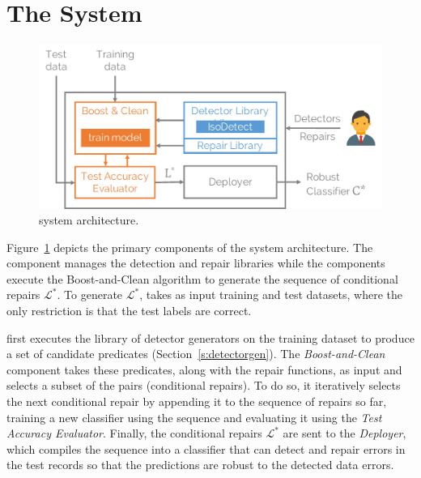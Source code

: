 \section{The \sys System}\label{s:arch}
 
\begin{figure}[t]
\centering
\includegraphics[width=\columnwidth]{figures/arch.pdf}
\caption{\sys system architecture.}
\label{f:arch}
\end{figure}

Figure~\ref{f:arch} depicts the primary components of the system architecture. The  component manages the detection and repair libraries while the  components execute the Boost-and-Clean algorithm to generate the sequence of conditional repairs $\mathcal{L}^*$.  To generate $\mathcal{L}^*$, \sys takes as input training and test datasets, where the only restriction is that the test labels are correct. 

\sys first executes the library of detector generators on the training dataset to produce a set of candidate predicates (Section~\ref{s:detectorgen}).    The {\it Boost-and-Clean} component takes these predicates, along with the repair functions, as input and selects a subset of the pairs (conditional repairs).  To do so, it iteratively selects the next conditional repair by appending it to the sequence of repairs so far, training a new classifier using the sequence and evaluating it using the {\it Test Accuracy Evaluator}.  Finally, the conditional repairs $\mathcal{L}^*$ are sent to the {\it Deployer}, which compiles the sequence into a  classifier that can detect and repair errors in the test records so that the predictions are robust to the detected data errors.  

